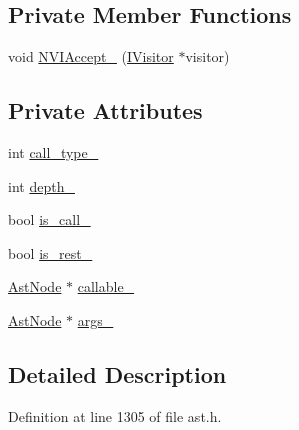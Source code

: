 \subsection*{Private Member Functions}
\begin{DoxyCompactItemize}
\item 
void \hyperlink{classmocha_1_1_call_exp_a6f03e2ebd560f6cc4bd9ce46247ae2d9}{NVIAccept\_\-} (\hyperlink{classmocha_1_1_i_visitor}{IVisitor} $\ast$visitor)
\end{DoxyCompactItemize}
\subsection*{Private Attributes}
\begin{DoxyCompactItemize}
\item 
int \hyperlink{classmocha_1_1_call_exp_adf02829fd9136829d210bd49d5997862}{call\_\-type\_\-}
\item 
int \hyperlink{classmocha_1_1_call_exp_a1437212b3b447a50e5fbf50512058d79}{depth\_\-}
\item 
bool \hyperlink{classmocha_1_1_call_exp_a30bdde50d77e5a8da0f8e61897903c0a}{is\_\-call\_\-}
\item 
bool \hyperlink{classmocha_1_1_call_exp_ab345a4e9c56c57a1a5f97b60f17d7c5b}{is\_\-rest\_\-}
\item 
\hyperlink{classmocha_1_1_ast_node}{AstNode} $\ast$ \hyperlink{classmocha_1_1_call_exp_a3e15d3b3c94bdf3f046d45d3b605797a}{callable\_\-}
\item 
\hyperlink{classmocha_1_1_ast_node}{AstNode} $\ast$ \hyperlink{classmocha_1_1_call_exp_aff9ea512c5d25426b28c7801aba758c6}{args\_\-}
\end{DoxyCompactItemize}


\subsection{Detailed Description}


Definition at line 1305 of file ast.h.



